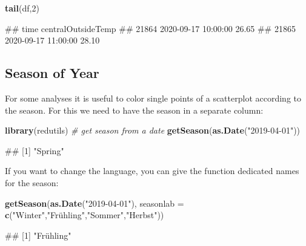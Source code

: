 \documentclass[
]{book}
\newenvironment{Shaded}{\begin{snugshade}}{\end{snugshade}}
\newcommand{\CommentTok}[1]{\textcolor[rgb]{0.56,0.35,0.01}{\textit{#1}}}
\newcommand{\DataTypeTok}[1]{\textcolor[rgb]{0.13,0.29,0.53}{#1}}
\newcommand{\DecValTok}[1]{\textcolor[rgb]{0.00,0.00,0.81}{#1}}
\newcommand{\KeywordTok}[1]{\textcolor[rgb]{0.13,0.29,0.53}{\textbf{#1}}}
\newcommand{\NormalTok}[1]{#1}
\newcommand{\StringTok}[1]{\textcolor[rgb]{0.31,0.60,0.02}{#1}}
\let\oldShaded\Shaded
\let\endoldShaded\endShaded
\renewenvironment{Shaded}{\footnotesize\oldShaded}{\endoldShaded}
\let\oldverbatim\verbatim
\let\endoldverbatim\endverbatim
\renewenvironment{verbatim}{\footnotesize\oldverbatim}{\endoldverbatim}
\begin{document}
\begin{Shaded}
\begin{Highlighting}[]
\KeywordTok{tail}\NormalTok{(df,}\DecValTok{2}\NormalTok{)}
\end{Highlighting}
\end{Shaded}

\begin{verbatim}
##                      time centralOutsideTemp
## 21864 2020-09-17 10:00:00              26.65
## 21865 2020-09-17 11:00:00              28.10
\end{verbatim}

\hypertarget{season-of-year}{%
\subsection{Season of Year}\label{season-of-year}}

For some analyses it is useful to color single points of a scatterplot according to the season. For this we need to have the season in a separate column:

\begin{Shaded}
\begin{Highlighting}[]
\KeywordTok{library}\NormalTok{(redutils)}
\CommentTok{# get season from a date}
\KeywordTok{getSeason}\NormalTok{(}\KeywordTok{as.Date}\NormalTok{(}\StringTok{"2019-04-01"}\NormalTok{))}
\end{Highlighting}
\end{Shaded}

\begin{verbatim}
## [1] "Spring"
\end{verbatim}

If you want to change the language, you can give the function dedicated names for the season:

\begin{Shaded}
\begin{Highlighting}[]
\KeywordTok{getSeason}\NormalTok{(}\KeywordTok{as.Date}\NormalTok{(}\StringTok{"2019-04-01"}\NormalTok{),}
                  \DataTypeTok{seasonlab =} \KeywordTok{c}\NormalTok{(}\StringTok{"Winter"}\NormalTok{,}\StringTok{"Frühling","}\NormalTok{Sommer}\StringTok{","}\NormalTok{Herbst}\StringTok{"))}
\end{Highlighting}
\end{Shaded}

\begin{verbatim}
## [1] "Frühling"
\end{verbatim}
\end{document}
